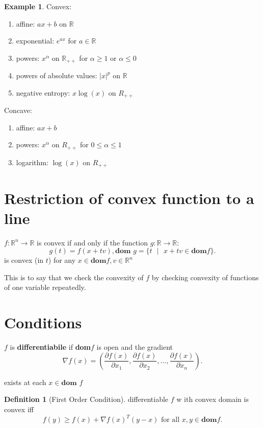 \documentclass{report}
\theoremstyle{remark} \newtheorem{remark}{Remark}[section]
\theoremstyle{definition}
\newtheorem{definition}{Definition}[section]
\theoremstyle{definition}
\newtheorem{example}{Example}[section]
\theoremstyle{definition}
\theoremstyle{remark}
\begin{document}
\begin{example}
    Convex:
    \begin{enumerate}
        \item affine: $ax+b$ on $\mathbb{R}$ 
            \item exponential: $e^{ax}$ for $a\in\mathbb{R}$ 
                \item powers: $x^{\alpha}$ on $\mathbb{R}_{++}$ for $\alpha\ge 1$ or $\alpha\le 0$
                     \item powers of absolute values: $|x|^{p}$ on $\mathbb{R}$ 
                 \item negative entropy: $x \log(x)$ on $R_{++}$
    \end{enumerate}
    Concave:
    \begin{enumerate}
        \item affine: $ax+b$ 
    \item powers: $x^{\alpha}$ on $R_{++}$ for  $0 \le \alpha \le 1$
        \item logarithm: $\log(x)$ on $R_{++}$
    \end{enumerate}
\end{example}

\section{Restriction of convex function to a line}

$f:\mathbb{R}^{n}\to \mathbb{R}$ is convex if and only if the function $g:\mathbb{R}\to \mathbb{R}$:
\[
g(t) = f(x + tv), \textbf{dom }g = \{t \text{ }| \text{ }x + tv\in \textbf{dom}f\}
.\] 
is convex (in $t$) for any $x\in \textbf{dom}f,v\in \mathbb{R}^{n}$

This is to say that we check the convexity of $f$ by checking convexity of functions of one variable repeatedly.

\section{Conditions}

$f$ is \textbf{differentiabile} if \textbf{dom}$f$ is open and the gradient
\[
\nabla f(x) = (\frac{\partial f(x)}{\partial x_1}, \frac{\partial f(x)}{\partial x_2} ,\ldots, \frac{\partial f(x)}{\partial x_n} )    
.\] 

exists at each $x \in \textbf{dom }f$

\begin{definition}[First Order Condition]
    differentiable $f$ w ith convex domain is convex iff
    \[
    f(y)\ge f(x) + \nabla f(x)^{T}(y-x) \text{ for all }x,y\in\textbf{dom}f
    .\] 
\end{definition}
\end{document}
